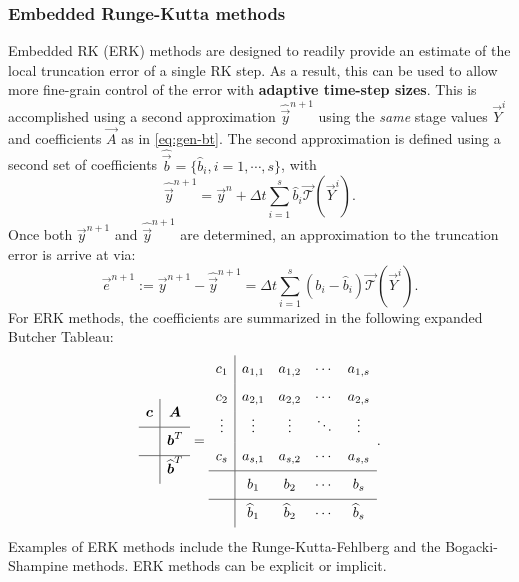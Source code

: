 \documentclass{article}
\begin{document}
\subsubsection{Embedded Runge-Kutta methods} Embedded RK (ERK) methods are designed to readily provide
an estimate of the local truncation error of a single RK step. As a result, this
can be used to allow more fine-grain control of the error with \textbf{adaptive time-step sizes}.
This is accomplished using a second approximation $\widehat{\vec{y}}^{n+1}$ using the \emph{same}
stage values $\vec{Y}^i$ and coefficients $\vec{A}$ as in \eqref{eq:gen-bt}.
The second approximation is defined using a second set of coefficients $\widehat{\vec{b}} =
\lbrace \widehat{b}_i, i = 1, \cdots, s\rbrace$, with
\begin{equation}
	\widehat{\vec{y}}^{n+1} = \vec{y}^n + \Delta t \sum_{i=1}^{s} \widehat{b}_i \vec{\mathcal{T}}(\vec{Y}^i).
\end{equation}
Once both $\vec{y}^{n+1}$ and $\widehat{\vec{y}}^{n+1}$
are determined, an approximation to the truncation error is arrive at via:
\begin{equation}
	\vec{e}^{n+1} := \vec{y}^{n+1} - \widehat{\vec{y}}^{n+1} =
	\Delta t \sum_{i=1}^{s}\left(b_i - \widehat{b}_i\right)\vec{\mathcal{T}}(\vec{Y}^i).
\end{equation}
For ERK methods, the coefficients are summarized in the following expanded Butcher Tableau:
\begin{equation}\label{eq:gen-bt-form}
\begin{array}{c|c}
\ST \vec{c} &\vec{A}\\
\hline
\ST  & \vec{b}^T \\
\hline
\ST  & \widehat{\vec{b}}^T
\end{array} =
\begin{array}{c|c c c c}
\ST c_1 & a_{1,1} & a_{1,2} & \cdots & a_{1,s}\\
\ST c_2 & a_{2,1} & a_{2,2} & \cdots & a_{2,s}\\
\ST \vdots & \vdots & \vdots & \ddots & \vdots \\
\ST c_s & a_{s,1} & a_{s,2} & \cdots & a_{s,s}\\
\hline
\ST  & b_1 & b_2 & \cdots & b_s \\
\hline
\ST  & \widehat{b}_1 & \widehat{b}_2 & \cdots & \widehat{b}_s
\end{array}.
\end{equation}
Examples of ERK methods include the Runge-Kutta-Fehlberg \cite{fehlberg1969low}
and the Bogacki-Shampine \cite{bogacki19893} methods. ERK methods can be explicit
or implicit.
\end{document}
